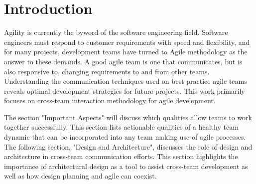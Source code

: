 \section{Introduction}
Agility is currently the byword of the software engineering field.
Software engineers must respond to customer requirements with speed and flexibility, and for many projects, development teams have turned to Agile methodology as the answer to these demands.
A good agile team is one that communicates, but is also responsive to, changing requirements to and from other teams.
Understanding the communication techniques used on best practice agile teams reveals optimal development strategies for future projects.
This work primarily focuses on cross-team interaction methodology for agile development.


The section "Important Aspects" will discuss which qualities allow teams to work together successfully.
This section lists actionable qualities of a healthy team dynamic that can be incorporated into any team making use of agile processes.
The following section, "Design and Architecture", discusses the role of design and architecture in cross-team communication efforts.
This section highlights the importance of architectural design as a tool to assist cross-team development as well as how design planning and agile can coexist.
